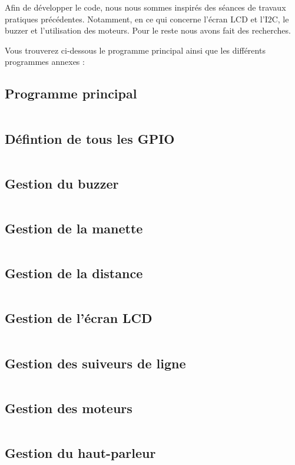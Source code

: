 Afin de développer le code, nous nous sommes inspirés des séances de travaux pratiques précédentes. Notamment, en ce qui concerne l'écran LCD et l'I2C, le buzzer et l'utilisation des moteurs. Pour le reste nous avons fait des recherches.

Vous trouverez ci-dessous le programme principal ainsi que les différents programmes annexes :

\subsection{Programme principal}
    \inputminted{c}{../code/src/main.c}
\subsection{Défintion de tous les GPIO}
    \inputminted{c}{../code/src/gpioPins.h}
\subsection{Gestion du buzzer}
    \inputminted{c}{../code/src/buzzer.c}
\subsection{Gestion de la manette}
    \inputminted{c}{../code/src/controller.c}
\subsection{Gestion de la distance}
    \inputminted{c}{../code/src/distance.c}
\subsection{Gestion de l'écran LCD}
    \inputminted{c}{../code/src/i2cLCD.c}
\subsection{Gestion des suiveurs de ligne}
    \inputminted{c}{../code/src/lineFinder.c}
\subsection{Gestion des moteurs}
    \inputminted{c}{../code/src/motors.c}
\subsection{Gestion du haut-parleur}
    \inputminted{c}{../code/src/speaker.c}

\newpage